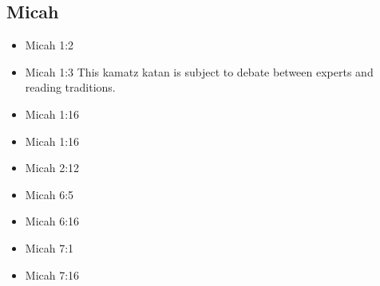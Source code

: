 \documentclass[14pt]{book}
\begin{document}
															\subsection{Micah}
														\begin{multicols}{2}\begin{itemize}
																
																\item Micah 1:2
																
																\item Micah 1:3 This kamatz katan is subject to debate between experts and reading traditions.
																
																\item Micah 1:16
																
																\item Micah 1:16
																
																\item Micah 2:12
																
																\item Micah 6:5
																
																\item Micah 6:16
																
																\item Micah 7:1
																
																\item Micah 7:16
																
																								\end{itemize}\end{multicols}
\end{document}
